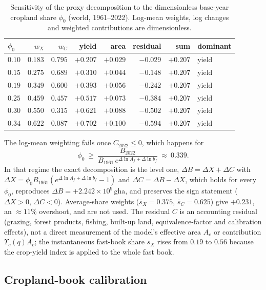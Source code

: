 \documentclass[11pt,a4paper]{article}
\newcommand{\Ups}{\Upsilon_c}
\begin{document}
\begin{table}[htbp]
\centering\small
\caption{Sensitivity of the proxy decomposition to the dimensionless base-year cropland share $\phi_0$ (world, 1961--2022). Log-mean weights, log changes and weighted contributions are dimensionless.}
\label{tab:si_phi0}
\begin{tabular}{l r r r r r r l}
\toprule
$\phi_0$ & $w_X$ & $w_C$ & yield & area & residual & sum & dominant \\
\midrule
$0.10$ & $0.183$ & $0.795$ & $+0.207$ & $+0.029$ & $-0.029$ & $+0.207$ & yield \\
$0.15$ & $0.275$ & $0.689$ & $+0.310$ & $+0.044$ & $-0.148$ & $+0.207$ & yield \\
$0.19$ & $0.349$ & $0.600$ & $+0.393$ & $+0.056$ & $-0.242$ & $+0.207$ & yield \\
$0.25$ & $0.459$ & $0.457$ & $+0.517$ & $+0.073$ & $-0.384$ & $+0.207$ & yield \\
$0.30$ & $0.550$ & $0.315$ & $+0.621$ & $+0.088$ & $-0.502$ & $+0.207$ & yield \\
$0.34$ & $0.622$ & $0.087$ & $+0.702$ & $+0.100$ & $-0.594$ & $+0.207$ & yield \\
\bottomrule
\end{tabular}
\end{table}

The log-mean weighting fails once $C_{2022}\le0$, which happens for
\begin{equation}
\phi_0\ \ge\ \frac{B_{2022}}{B_{1961}\,e^{\Delta\ln A_f+\Delta\ln b_f}}\ \approx\ 0.339 .
\end{equation}
In that regime the exact decomposition is the level one, $\Delta B=\Delta X+\Delta C$ with $\Delta X=\phi_0 B_{1961}(e^{\Delta\ln A_f+\Delta\ln b_f}-1)$ and $\Delta C=\Delta B-\Delta X$, which holds for every $\phi_0$, reproduces $\Delta B=+2.242\times10^{9}$\,gha, and preserves the sign statement ($\Delta X>0$, $\Delta C<0$). Average-share weights ($\bar s_X=0.375$, $\bar s_C=0.625$) give $+0.231$, an $\approx11\%$ overshoot, and are not used. The residual $C$ is an accounting residual (grazing, forest products, fishing, built-up land, equivalence-factor and calibration effects), not a direct measurement of the model's effective area $A_c$ or contribution $\Ups(q)A_c$; the instantaneous fast-book share $s_X$ rises from $0.19$ to $0.56$ because the crop-yield index is applied to the whole fast book.

\subsection{Cropland-book calibration}\label{si:cropland}
\end{document}
